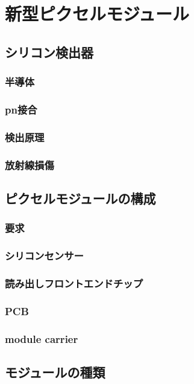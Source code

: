 \chapter{新型ピクセルモジュール}

\section{シリコン検出器}
\subsection{半導体}
\subsection{pn接合}
\subsection{検出原理}
\subsection{放射線損傷}

\section{ピクセルモジュールの構成}
\subsection{要求}
\subsection{シリコンセンサー}
\subsection{読み出しフロントエンドチップ}
\subsection{PCB}
\subsection{module carrier}

\section{モジュールの種類}
